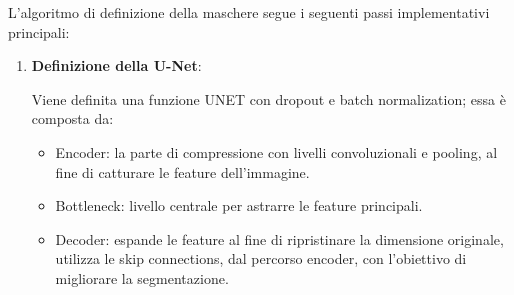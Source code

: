 \documentclass[12pt,a4paper,openright,twoside]{book}
\begin{document}
L'algoritmo di definizione della maschere segue i seguenti passi implementativi principali:
\begin{enumerate}
\item \textbf{Definizione della U-Net}:
\begin{figure}[H]
    \centering
    
\end{figure}

Viene definita una funzione UNET con dropout e batch normalization; essa è composta da:
\begin{itemize}
\item Encoder: la parte di compressione con livelli convoluzionali e pooling, al fine di catturare le feature dell'immagine.
\item Bottleneck: livello centrale per astrarre le feature principali.
\item Decoder: espande le feature al fine di ripristinare la dimensione originale, utilizza le skip connections, dal percorso encoder, con l'obiettivo di migliorare la segmentazione.
\end{itemize}


\end{enumerate}
\end{document}
